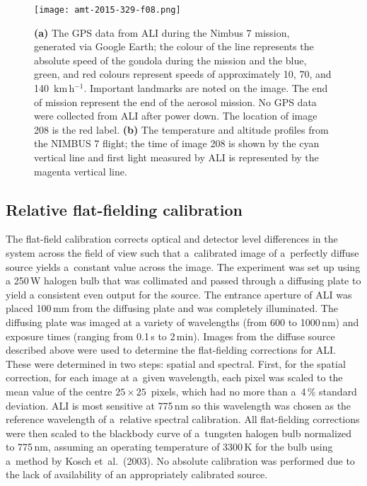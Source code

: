 \documentclass[amt]{copernicus}
\begin{document}
\begin{figure*}[t]
\texttt{[image: amt-2015-329-f08.png]}
\caption{\textbf{(a)} The GPS data from ALI during the Nimbus 7
  mission, generated via Google Earth; the colour of the line
  represents the absolute speed of the gondola during the
  mission and the blue, green, and red colours represent speeds of approximately
  10, 70, and 140~km\,h$^{-1}$. Important landmarks are noted on the image. The end of
  mission represent the end of the aerosol mission. No GPS data were
  collected from ALI after power down. The location of image 208 is
  the red label. \textbf{(b)} The temperature and altitude profiles
  from the NIMBUS 7 flight; the time of image 208 is shown by the
  cyan vertical line and first light measured by ALI is represented by the
  magenta vertical line.}
\end{figure*}


\subsection{Relative flat-fielding calibration}

The flat-field calibration corrects optical and detector level
differences in the system across the field of view such that
a~calibrated image of a~perfectly diffuse source yields a~constant
value across the image. The experiment was set up using a 250\,W halogen bulb that was collimated and
passed through a diffusing plate to yield a consistent even output for the source. The entrance aperture of
ALI was placed 100\,mm from the diffusing plate and was completely illuminated. The diffusing plate was
imaged at a variety of wavelengths (from 600 to 1000\,nm) and exposure times (ranging from 0.1\,s to 2\,min). Images from the diffuse source
described above were used to determine the flat-fielding corrections
for ALI. These were determined in two steps: spatial and
spectral. First, for the spatial correction, for each image at a~given
wavelength, each pixel was scaled to the mean value of the centre
$25\times 25$~pixels, which had no more than a~4\,{\%} standard
deviation. ALI is most sensitive at 775\,\unit{nm} so this wavelength
was chosen as the reference wavelength of a~relative spectral
calibration. All flat-fielding corrections were then scaled to the
blackbody curve of a~tungsten halogen bulb normalized to
775\,\unit{nm}, assuming an operating temperature of 3300\,\unit{K} for
the bulb using a~method by Kosch et~al.~(2003). No absolute
calibration was performed due to the lack of availability of an
appropriately calibrated source.\hack{\vspace{-3mm}}
\end{document}
